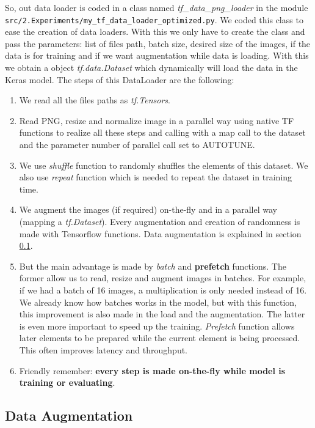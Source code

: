 So, out data loader is coded in a class named \textit{tf\_data\_png\_loader} in the module \texttt{src\-/2.Experiments\-/my\_tf\_data\-\_loader\-\_optimized\-.py}. We coded this class to ease the creation of data loaders. With this we only have to create the class and pass the parameters: list of files path, batch size, desired size of the images, if the data is for training and if we want augmentation while data is loading. With this we obtain a object \textit{tf.data.Dataset} which dynamically will load the data in the Keras model. The steps of this DataLoader are the following:
\begin{enumerate}
    \item We read all the files paths as \textit{tf.Tensors}.
    \item Read PNG, resize and normalize image in a parallel way using native TF functions to realize all these steps and calling with a map call to the dataset and the parameter number of parallel call set to AUTOTUNE.
    \item We use \textit{shuffle} function to randomly shuffles the elements of this dataset. We also use \textit{repeat} function which is needed to repeat the dataset in training time.
    \item We augment the images (if required) on-the-fly and in a parallel way (mapping a \textit{tf.Dataset}). Every augmentation and creation of randomness is made with Tensorflow functions. Data augmentation is explained in section \ref{subsection:dataaug}.
    \item But the main advantage is made by \textit{batch} and \textbf{prefetch} functions. The former allow us to read, resize and augment images in batches. For example, if we had a batch of 16 images, a multiplication is only needed instead of 16. We already know how batches works in the model, but with this function, this improvement is also made in the load and the augmentation. The latter is even more important to speed up the training. \textit{Prefetch} function allows later elements to be prepared while the current element is being processed. This often improves latency and throughput.
    \item Friendly remember: \textbf{every step is made on-the-fly while model is training or evaluating}.
\end{enumerate}

\subsection{Data Augmentation}
\label{subsection:dataaug}

